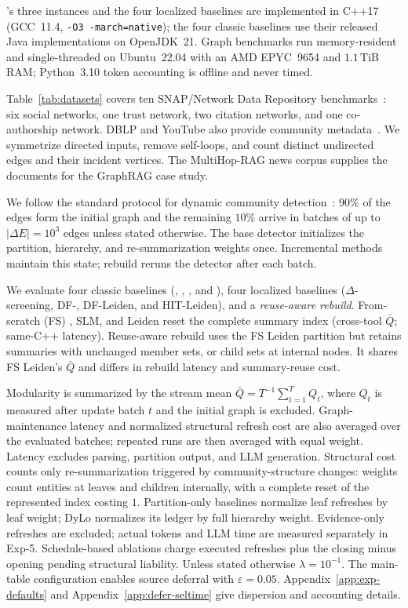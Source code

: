  \DyLo{}'s three instances and the four localized baselines
are implemented in C++17 (GCC~11.4,
\texttt{-O3 -march=native}); the four classic baselines use their released Java
implementations on OpenJDK~21. Graph benchmarks run memory-resident and single-threaded
on Ubuntu~22.04 with an AMD EPYC~9654 and $1.1$\,TiB RAM; Python~3.10 token
accounting is offline and never timed.


 Table~\ref{tab:datasets} covers ten SNAP/Network Data
Repository benchmarks~\cite{snapnets,nr}: six social networks, one trust
network, two citation networks, and one co-authorship network. DBLP and
YouTube also provide community metadata~\cite{yang2012groundtruth}.
We symmetrize
directed inputs, remove self-loops, and count distinct undirected edges and
their incident vertices. The MultiHop-RAG news corpus supplies the documents
for the GraphRAG case study.

 We follow the standard protocol for dynamic community
detection~\cite{zhuang2019dynamo}: $90\%$ of the edges form the initial graph
and the remaining $10\%$ arrive in batches of up to $|\Delta E|=10^3$ edges
unless stated otherwise. The base detector initializes the partition,
hierarchy, and re-summarization weights once. Incremental methods maintain
this state; rebuild reruns the detector after each batch.

 We evaluate four classic baselines (\DynaMo{}, \Batch{},
\GreMod{}, and \QCA{}), four localized baselines ($\Delta$-screening,
DF-\Louvain{}, DF-Leiden, and HIT-Leiden), and a \emph{reuse-aware rebuild}.
From-scratch (FS) \Louvain{}, SLM, and Leiden reset the complete summary index
(cross-tool $\bar Q$; same-C++ latency). Reuse-aware rebuild uses the FS Leiden
partition but retains summaries with unchanged member sets, or child sets
at internal nodes. It shares FS Leiden's $\bar Q$ and differs in rebuild
latency and summary-reuse cost.

 Modularity is summarized by the stream mean
$\bar Q=T^{-1}\sum_{t=1}^{T}Q_t$, where $Q_t$ is measured after update batch
$t$ and the initial graph is excluded. Graph-maintenance latency and normalized
structural refresh cost are also averaged over the evaluated batches; repeated
runs are then averaged with equal weight. Latency excludes parsing, partition
output, and LLM generation.
Structural cost counts only re-summarization triggered by community-structure
changes: weights count entities at leaves and children internally, with a
complete reset of the represented index costing $1$. Partition-only baselines normalize leaf refreshes by leaf weight; DyLo
normalizes its ledger by full hierarchy weight.
Evidence-only refreshes are excluded; actual
tokens and LLM time are measured separately in Exp-5. Schedule-based ablations
charge executed refreshes plus the closing minus opening pending structural
liability.
Unless stated otherwise $\lambda=10^{-1}$. The main-table configuration
enables source deferral with $\varepsilon=0.05$. Appendix~\ref{app:exp-defaults}
and Appendix~\ref{app:defer-seltime} give dispersion and accounting details.

